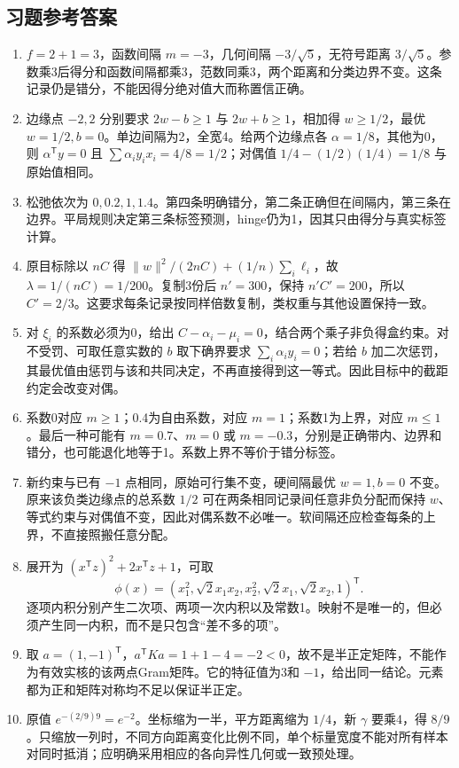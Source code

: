 \documentclass[UTF8,fontset=none,zihao=-4,a4paper]{ctexart}
\numberwithin{equation}{section}
\numberwithin{figure}{section}
\begin{document}
\clearpage\subsection{习题参考答案}
\begin{enumerate}[label=17.\arabic*]
\item $f=2+1=3$，函数间隔 $m=-3$，几何间隔 $-3/\sqrt5$，无符号距离 $3/\sqrt5$。参数乘3后得分和函数间隔都乘3，范数同乘3，两个距离和分类边界不变。这条记录仍是错分，不能因得分绝对值大而称置信正确。
\item 边缘点 $-2,2$ 分别要求 $2w-b\ge1$ 与 $2w+b\ge1$，相加得 $w\ge1/2$，最优 $w=1/2,b=0$。单边间隔为2，全宽4。给两个边缘点各 $\alpha=1/8$，其他为0，则 $\alpha^{\mathsf T}y=0$ 且 $\sum\alpha_i y_ix_i=4/8=1/2$；对偶值 $1/4-(1/2)(1/4)=1/8$ 与原始值相同。
\item 松弛依次为 $0,0.2,1,1.4$。第四条明确错分，第二条正确但在间隔内，第三条在边界。平局规则决定第三条标签预测，hinge仍为1，因其只由得分与真实标签计算。
\item 原目标除以 $nC$ 得 $\|w\|^2/(2nC)+(1/n)\sum_i\ell_i$，故 $\lambda=1/(nC)=1/200$。复制3份后 $n'=300$，保持 $n'C'=200$，所以 $C'=2/3$。这要求每条记录按同样倍数复制，类权重与其他设置保持一致。
\item 对 $\xi_i$ 的系数必须为0，给出 $C-\alpha_i-\mu_i=0$，结合两个乘子非负得盒约束。对不受罚、可取任意实数的 $b$ 取下确界要求 $\sum_i\alpha_i y_i=0$；若给 $b$ 加二次惩罚，其最优值由惩罚与该和共同决定，不再直接得到这一等式。因此目标中的截距约定会改变对偶。
\item 系数0对应 $m\ge1$；0.4为自由系数，对应 $m=1$；系数1为上界，对应 $m\le1$。最后一种可能有 $m=0.7$、$m=0$ 或 $m=-0.3$，分别是正确带内、边界和错分，也可能退化地等于1。系数上界不等价于错分标签。
\newpage
\item 新约束与已有 $-1$ 点相同，原始可行集不变，硬间隔最优 $w=1,b=0$ 不变。原来该负类边缘点的总系数 $1/2$ 可在两条相同记录间任意非负分配而保持 $w$、等式约束与对偶值不变，因此对偶系数不必唯一。软间隔还应检查每条的上界，不直接照搬任意分配。
\item 展开为 $(x^{\mathsf T}z)^2+2x^{\mathsf T}z+1$，可取
\[
 \phi(x)=(x_1^2,\sqrt2x_1x_2,x_2^2,
          \sqrt2x_1,\sqrt2x_2,1)^{\mathsf T}.
\]
逐项内积分别产生二次项、两项一次内积以及常数1。映射不是唯一的，但必须产生同一内积，而不是只包含“差不多的项”。
\item 取 $a=(1,-1)^{\mathsf T}$，$a^{\mathsf T}Ka=1+1-4=-2<0$，故不是半正定矩阵，不能作为有效实核的该两点Gram矩阵。它的特征值为3和 $-1$，给出同一结论。元素都为正和矩阵对称均不足以保证半正定。
\item 原值 $e^{-(2/9)9}=e^{-2}$。坐标缩为一半，平方距离缩为 $1/4$，新 $\gamma$ 要乘4，得 $8/9$。只缩放一列时，不同方向距离变化比例不同，单个标量宽度不能对所有样本对同时抵消；应明确采用相应的各向异性几何或一致预处理。

\end{enumerate}
\end{document}
